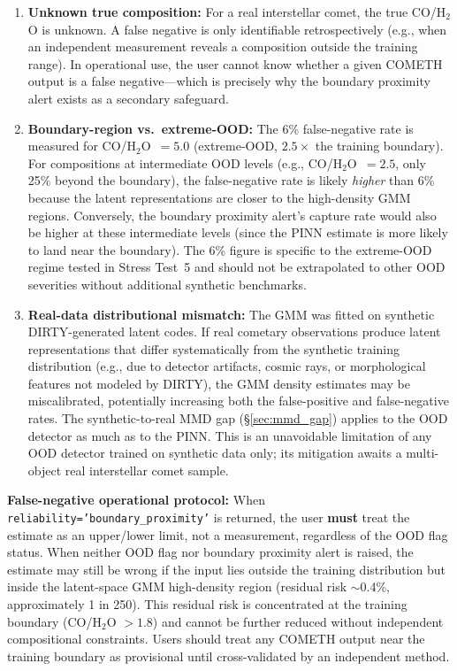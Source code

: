 \documentclass[usenatbib]{mnras}
\begin{document}
\begin{enumerate}
    \item \textbf{Unknown true composition:} For a real interstellar comet, the true CO/H$_2$O is unknown. A false negative is only identifiable retrospectively (e.g., when an independent measurement reveals a composition outside the training range). In operational use, the user cannot know whether a given COMETH output is a false negative---which is precisely why the boundary proximity alert exists as a secondary safeguard.
    \item \textbf{Boundary-region vs.\ extreme-OOD:} The 6\% false-negative rate is measured for CO/H$_2$O~$=5.0$ (extreme-OOD, $2.5\times$ the training boundary). For compositions at intermediate OOD levels (e.g., CO/H$_2$O~$=2.5$, only 25\% beyond the boundary), the false-negative rate is likely \textit{higher} than 6\% because the latent representations are closer to the high-density GMM regions. Conversely, the boundary proximity alert's capture rate would also be higher at these intermediate levels (since the PINN estimate is more likely to land near the boundary). The 6\% figure is specific to the extreme-OOD regime tested in Stress Test~5 and should not be extrapolated to other OOD severities without additional synthetic benchmarks.
    \item \textbf{Real-data distributional mismatch:} The GMM was fitted on synthetic DIRTY-generated latent codes. If real cometary observations produce latent representations that differ systematically from the synthetic training distribution (e.g., due to detector artifacts, cosmic rays, or morphological features not modeled by DIRTY), the GMM density estimates may be miscalibrated, potentially increasing both the false-positive and false-negative rates. The synthetic-to-real MMD gap (\S\ref{sec:mmd_gap}) applies to the OOD detector as much as to the PINN. This is an unavoidable limitation of any OOD detector trained on synthetic data only; its mitigation awaits a multi-object real interstellar comet sample.
\end{enumerate}

\textbf{False-negative operational protocol:} When \texttt{reliability='boundary\_proximity'} is returned, the user \textbf{must} treat the estimate as an upper/lower limit, not a measurement, regardless of the OOD flag status. When neither OOD flag nor boundary proximity alert is raised, the estimate may still be wrong if the input lies outside the training distribution but inside the latent-space GMM high-density region (residual risk $\sim$0.4\%, approximately 1 in 250). This residual risk is concentrated at the training boundary (CO/H$_2$O $> 1.8$) and cannot be further reduced without independent compositional constraints. Users should treat any COMETH output near the training boundary as provisional until cross-validated by an independent method.
\end{document}
